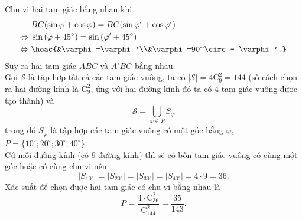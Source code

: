 \begin{vd}
{\begin{center}
		\end{center}
		Chu vi hai tam giác bằng nhau khi 
		\begin{align*}
		& BC (\sin \varphi + \cos \varphi ) = BC  (\sin \varphi' + \cos \varphi' ) \\\Leftrightarrow~  & \sin \left ( \varphi + 45^\circ\right ) = \sin \left ( \varphi' + 45^\circ\right ) \\\Leftrightarrow~  & \hoac{&\varphi =\varphi'\\&\varphi =90^\circ - \varphi'.}
		\end{align*}
		Suy ra hai tam giác $ABC$ và $A'BC$ bằng nhau. \\
		Gọi $\mathscr{S}$ là tập hợp tất cả các tam giác vuông, ta có $|\mathscr{S}| = 4\mathrm{C}_9^2=144$ (số cách chọn ra hai đường kính là $\mathrm{C}_9^2$, ứng với hai đường kính đó ta có $4$ tam giác vuông được tạo thành) và  \[\mathscr{S} = \bigcup_{\varphi \in  P} S_{\varphi}\]
		trong đó $S_{\varphi}$   là tập hợp các tam giác vuông có một góc bằng $\varphi$, $P = \Big \{ 10^\circ;20^\circ;30^\circ;40^\circ\Big \}$. \\
		Cứ mỗi đường kính (có $9$ đường kính) thì sẽ có bốn tam giác vuông có cùng một góc hoặc có cùng chu vi nên
		\[|S_{10^\circ}| = |S_{20^\circ}|=|S_{30^\circ}|=|S_{40^\circ}|=4 \cdot 9 =36.\]
		Xác suất để chọn được hai tam giác có chu vi bằng nhau là 
		\[P=\dfrac{4 \cdot \mathrm{C}_{36}^2}{\mathrm{C}_{144}^2} =\dfrac{35}{143}.\]
	}
\end{vd}
